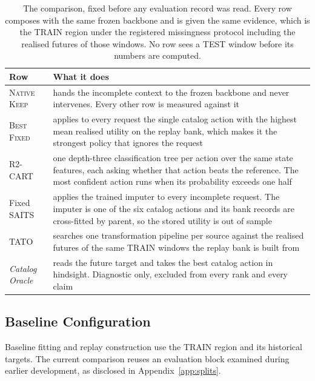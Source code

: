 \documentclass{article}
\begin{document}
\begin{table}[htbp]
  \caption{The comparison, fixed before any evaluation record was read. Every row composes with
  the same frozen backbone and is given the same evidence, which is the TRAIN region under the
  registered missingness protocol including the realised futures of those windows. No row sees
  a TEST window before its numbers are computed.}
  \label{tab:app-roster}
  \centering
  \small
  \setlength{\tabcolsep}{4pt}
\begin{tabular}{@{}l p{}@{}}
    \toprule
    Row & What it does \\
    \midrule
    \textsc{Native Keep} & hands the incomplete context to the frozen backbone and never intervenes. Every other row is measured against it \\
    \textsc{Best Fixed} & applies to every request the single catalog action with the highest mean realised utility on the replay bank, which makes it the strongest policy that ignores the request \\
    R2-CART & one depth-three classification tree per action over the same state features, each asking whether that action beats the reference. The most confident action runs when its probability exceeds one half \\
    Fixed SAITS & applies the trained imputer to every incomplete request. The imputer is one of the six catalog actions and its bank records are cross-fitted by parent, so the stored utility is out of sample \\
    TATO & searches one transformation pipeline per source against the realised futures of the same TRAIN windows the replay bank is built from \\
    \emph{Catalog Oracle} & reads the future target and takes the best catalog action in hindsight. Diagnostic only, excluded from every rank and every claim \\
    \bottomrule
  \end{tabular}
\end{table}

\subsection{Baseline Configuration}
\label{app:baseline-config}
Baseline fitting and replay construction use the TRAIN region and its historical targets.
The current comparison reuses an evaluation block examined during earlier development, as
disclosed in Appendix~\ref{app:splits}.
\end{document}
